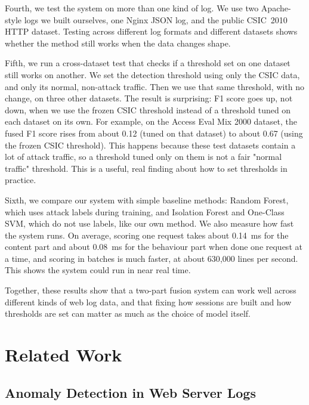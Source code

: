 \documentclass[futureinternet,article,accept,moreauthors]{Definitions/mdpi}
\begin{document}
Fourth, we test the system on more than one kind of log. We use two Apache-style logs we built ourselves, one Nginx JSON log, and the public CSIC~2010 HTTP dataset. Testing across different log formats and different datasets shows whether the method still works when the data changes shape.

Fifth, we run a cross-dataset test that checks if a threshold set on one dataset still works on another. We set the detection threshold using only the CSIC data, and only its normal, non-attack traffic. Then we use that same threshold, with no change, on three other datasets. The result is surprising: F1 score goes up, not down, when we use the frozen CSIC threshold instead of a threshold tuned on each dataset on its own. For example, on the Access Eval Mix 2000 dataset, the fused F1 score rises from about 0.12 (tuned on that dataset) to about 0.67 (using the frozen CSIC threshold). This happens because these test datasets contain a lot of attack traffic, so a threshold tuned only on them is not a fair "normal traffic" threshold. This is a useful, real finding about how to set thresholds in practice.

Sixth, we compare our system with simple baseline methods: Random Forest, which uses attack labels during training, and Isolation Forest and One-Class SVM, which do not use labels, like our own method. We also measure how fast the system runs. On average, scoring one request takes about 0.14~ms for the content part and about 0.08~ms for the behaviour part when done one request at a time, and scoring in batches is much faster, at about 630{,}000 lines per second. This shows the system could run in near real time.

Together, these results show that a two-part fusion system can work well across different kinds of web log data, and that fixing how sessions are built and how thresholds are set can matter as much as the choice of model itself.

\section{Related Work} \label{sec3}

\subsection{Anomaly Detection in Web Server Logs}
\end{document}
